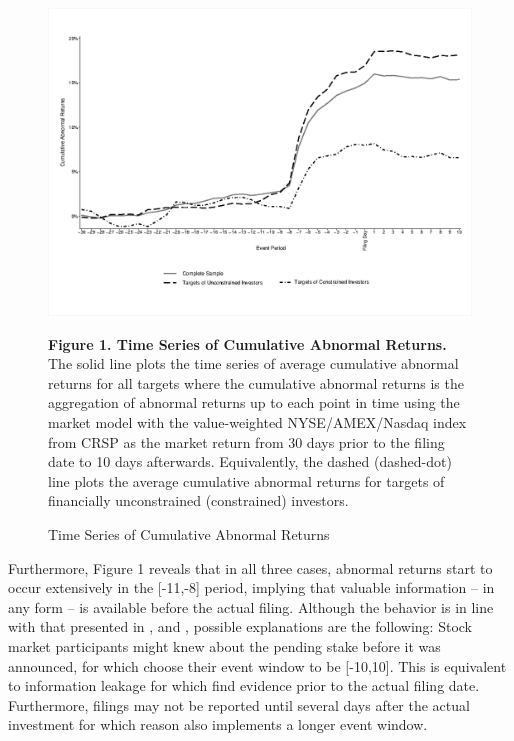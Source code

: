 \documentclass[12pt]{article}
\begin{document}
\begin{figure}[!htb]
	\centering
	\captionsetup{textformat=empty,labelformat=blank}
	\caption{Time Series of Cumulative Abnormal Returns}
	\begin{adjustbox}{width=\textwidth}
		\includegraphics{WW-TimeS_copy.eps} \label{AR}
	\end{adjustbox}
	\justifying
	\noindent\footnotesize{}\textbf{Figure 1. Time Series of Cumulative Abnormal Returns.} The solid line plots the time series of average cumulative abnormal returns for all targets where the cumulative abnormal returns is the aggregation of abnormal returns up to each point in time using the market model with the value-weighted NYSE/AMEX/Nasdaq index from CRSP as the market return from 30 days prior to the filing date to 10 days afterwards. Equivalently, the dashed (dashed-dot) line plots the average cumulative abnormal returns for targets of financially unconstrained (constrained) investors. \par\medskip
\end{figure}
Furthermore, Figure 1 reveals that in all three cases, abnormal returns start to occur extensively in the [-11,-8] period, implying that valuable information -- in any form -- is available before the actual filing. Although the behavior is in line with that presented in \citet[p.1563]{Collin-Dufresne2015}, \citet[p.370]{Greenwood2009} and \citet[p.1756]{Brav2008}, possible explanations are the following: Stock market participants might knew about the pending stake before it was announced, for which \citet[p.2802]{Allen2000} choose their event window to be [-10,10]. This is equivalent to information leakage for which \citet[p.31]{Brigida2012} find evidence prior to the actual filing date. Furthermore, filings may not be reported until several days after the actual investment for which reason \citet[p.87]{Liao2014} also implements a longer event window.
\end{document}
